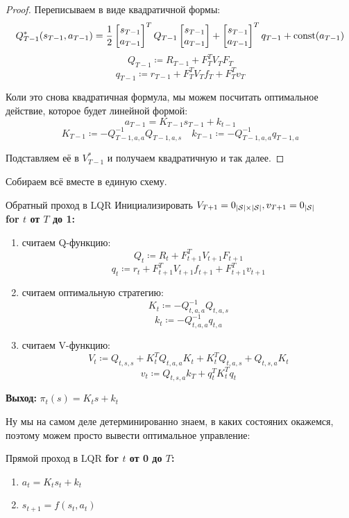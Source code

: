 \begin{theorem}
\begin{proof}
Переписываем в виде квадратичной формы:
$$Q^*_{T-1}(s_{T-1}, a_{T-1}) = \frac{1}{2} \begin{bmatrix} s_{T-1} \\ a_{T-1} \end{bmatrix}^T Q_{T-1} \begin{bmatrix} s_{T-1} \\ a_{T-1} \end{bmatrix} + \begin{bmatrix} s_{T-1} \\ a_{T-1} \end{bmatrix}^T q_{T-1} + \operatorname{const}(a_{T-1})$$
$$Q_{T-1} \coloneqq R_{T-1} + F_T^TV_TF_T$$
$$q_{T-1} \coloneqq r_{T-1} + F_T^T V_T f_T + F_T^T v_T$$

Коли это снова квадратичная формула, мы можем посчитать оптимальное действие, которое будет линейной формой:
$$a_{T-1} = K_{T-1}s_{T-1} + k_{t-1}$$
$$K_{T-1} \coloneqq -Q_{T-1, a, a}^{-1} Q_{T-1, a, s} \quad k_{T-1} \coloneqq -Q^{-1}_{T-1, a, a} q_{T-1,a}$$

Подставляем её в $V^*_{T-1}$ и получаем квадратичную и так далее.
\end{proof}
\end{theorem}

Собираем всё вместе в единую схему.

\begin{algorithm}{Обратный проход в LQR}
Инициализировать $V_{T+1} = 0_{|\mathcal{S}| \times |\mathcal{S}|}, v_{T+1} = 0_{|\mathcal{S}|}$ \\
\textbf{for $t$ от $T$ до 1:}
\begin{enumerate}
    \item считаем Q-функцию:
    $$Q_t \coloneqq R_t + F_{t+1}^TV_{t+1}F_{t+1}$$
    $$q_t \coloneqq r_t + F_{t+1}^TV_{t+1}f_{t+1} + F_{t+1}^T v_{t+1}$$
    \item считаем оптимальную стратегию:
    $$K_t \coloneqq -Q_{t, a, a}^{-1} Q_{t, a, s}$$
    $$k_t \coloneqq -Q^{-1}_{t, a, a} q_{t,a}$$
    \item считаем V-функцию:
    $$V_t \coloneqq Q_{t, s, s} + K_t^TQ_{t, a, a}K_t + K_t^TQ_{t, a, s} + Q_{t, s, a}K_t$$
    $$v_t \coloneqq Q_{t, s, a}k_T + q_t^T K_t^T q_t$$
\end{enumerate}

\vspace{0.3cm}
\textbf{Выход:} $\pi_t(s) = K_ts + k_t$
\end{algorithm}

Ну мы на самом деле детерминированно знаем, в каких состояних окажемся, поэтому можем просто вывести оптимальное управление:
\begin{algorithm}{Прямой проход в LQR}
\textbf{for $t$ от 0 до $T$:}
\begin{enumerate}
    \item $a_t = K_t s_t + k_t$
    \item $s_{t+1} = f(s_t, a_t)$
\end{enumerate}
\end{algorithm}

